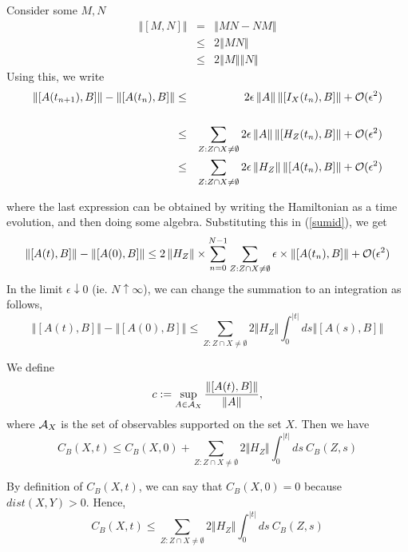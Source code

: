\documentclass[twoside]{article}
\newcommand{\ret}{\nonumber \\}
\newcommand{\be}{\begin{equation}}
\newcommand{\ee}{\end{equation}}
\begin{document}
Consider some $M,N$
\begin{eqnarray}
\left\Vert[M,N]\right\Vert &=& \left\Vert MN - NM\right\Vert\ret
&\le& 2\left\Vert MN \right\Vert\ret
&\le& 2\left\Vert M \right\Vert\left\Vert N \right\Vert
\end{eqnarray}
Using this, we write
\begin{eqnarray}
\left\Vert[A(t_{n+1}),B]\right\Vert-\left\Vert[A(t_n),B]\right\Vert 
&\le& 2\epsilon\left\Vert A \right\Vert \left\Vert [I_X(t_n),B] \right\Vert+{\cal O}(\epsilon^2)\ret\ret
&\le& \sum_{Z:Z\cap X\ne \emptyset}2\epsilon\left\Vert A \right\Vert \left\Vert [H_Z(t_n),B] \right\Vert+{\cal O}(\epsilon^2)\ret
&\le& \sum_{Z:Z\cap X\ne \emptyset}2\epsilon\left\Vert H_Z \right\Vert \left\Vert [A(t_n),B] \right\Vert+{\cal O}(\epsilon^2)
\end{eqnarray}

where the last expression can be obtained by writing the Hamiltonian as a time evolution, and then doing some algebra. Substituting this in (\ref{sumid}), we get
\be
 \left\Vert[A(t),B]\right\Vert-\left\Vert[A(0),B]\right\Vert 
\le 2\left\Vert H_Z \right\Vert \times \sum_{n=0}^{N-1}
\sum_{Z:Z\cap X\ne \emptyset} \epsilon \times \left\Vert [A(t_n),B] \right\Vert+{\cal O}(\epsilon^2)
\ee
In the limit $\epsilon\downarrow 0$ (ie. $N\uparrow\infty$), we can change the summation to an integration as follows,
\be
\left\Vert[A(t),B]\right\Vert-\left\Vert[A(0),B]\right\Vert 
\le \sum_{Z:Z\cap X\ne \emptyset}2\Vert H_Z\Vert\int_0^{|t|}ds 
\left\Vert[A(s),B]\right\Vert
\label{Commnormbound}
\ee


We define 
\begin{equation}
c:=\sup_{A\in{\cal A}_X}\frac{\Vert[A(t),B]\Vert}{\Vert A\Vert},
\label{CBXt}
\end{equation}
where ${\cal A}_X$ is the set of observables supported on
the set $X$. Then we have
\be
C_B(X,t)  \le C_B(X,0) +\sum_{Z:Z\cap X\ne \emptyset} 2\Vert H_Z\Vert\int_0^{|t|} ds\> C_B(Z,s)
\label{boundCB}
\ee
 
By definition of $C_B(X,t)$, we can say that $C_B(X,0) = 0$ because $dist(X,Y) > 0$. Hence,
\be
C_B(X,t)  \le \sum_{Z:Z\cap X\ne \emptyset} 2\Vert H_Z\Vert\int_0^{|t|} ds\> C_B(Z,s)
\ee
 
\end{document}
